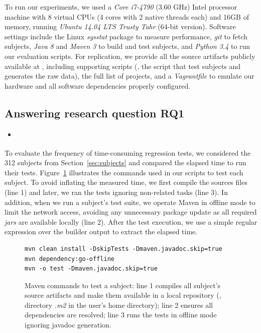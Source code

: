 To run our experiments, we used a \emph{Core i7-4790} (3.60 GHz) Intel
processor machine with 8 virtual CPUs (4 cores with 2 native threads
each) and 16GB of memory, running \emph{Ubuntu 14.04 LTS Trusty Tahr}
(64-bit version). Software settings include the Linux \emph{sysstat}
package to measure performance, \emph{git} to fetch subjects,
\emph{Java 8} and \emph{Maven 3} to build and test subjects, and
\emph{Python 3.4} to run our evaluation scripts. For replication, we
provide all the source artifacts publicly available at , including supporting scripts (\eg, the script that test
subjects and generates the raw data), the full list of projects, and a
\emph{Vagrantfile} to emulate our hardware and all software
dependencies properly configured.

\subsection{Answering research question RQ1}
\label{sec:rqone}

\begin{itemize}
    \item \emph{\RQA}
\end{itemize}

To evaluate the frequency of time-consuming regression tests, we
considered the 312 subjects from Section~\ref{sec:subjects} and
compared the elapsed time to run their tests.
Figure~\ref{fig:mvn-execution} illustrates the commands used in our
scripts to test each subject.  To avoid inflating the measured time,
we first compile the sources files (line 1) and later, we ran the
tests ignoring non-related tasks (line 3).  In addition, when we run a
subject's test suite, we operate Maven in offline mode to limit the
network access, avoiding any unnecessary package update as all
required \emph{jars} are available locally (line 2).  After the test
execution, we use a simple regular expression over the builder output
to extract the elapsed time.

\begin{figure}[h!]
\centering
\scriptsize
{}
\begin{lstlisting}
mvn clean install -DskipTests -Dmaven.javadoc.skip=true
mvn dependency:go-offline
mvn -o test -Dmaven.javadoc.skip=true
\end{lstlisting}
\caption{\label{fig:mvn-execution} Maven commands to test a subject:
    line 1 compiles all subject's source artifacts and make them
    available in a local repository (\ie, directory \emph{.m2} in the
    user's home directory); line 2 ensures all dependencies are
    resolved; line 3 runs the tests in offline mode ignoring javadoc
    generation.}
\end{figure}

